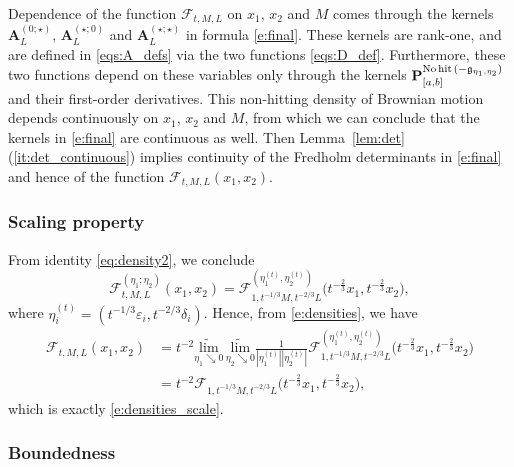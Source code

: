 \documentclass[oneside,final,11pt]{amsart}
\theoremstyle{definition}
\newcommand\nohit{\uptext{No\! hit}}
\newcommand{\fg}{\mathfrak{g}}
\newcommand{\mylim}[1]{\underset{#1}{\wt{\mathrm{lim}}}}
\newcommand{\dens}{\CF}
\newcommand{\1}[1]{\mathbf{1}_{#1}}
\newcommand{\eps}{\varepsilon}
\newcommand{\wt}{\widetilde}
\newcommand{\kmtext}[1]{{\color{red}[KM:#1]}}
\newcommand{\uptext}[1]{\text{\upshape{#1}}}
\newcommand{\fM}{M}
\newcommand{\fP}{\mathbf{P}}
\newcommand{\fA}{\mathbf{A}}
\newcommand{\CF}{\mathcal{F}}
\numberwithin{equation}{section}
\begin{document}
Dependence of the function $\dens_{t, \fM, L}$ on $x_1$, $x_2$ and $M$ comes through the kernels $\fA_L^{(0; \star)}$, $\fA_L^{(\star; 0)}$ and $\fA_L^{(\star; \star)}$ in formula \eqref{e:final}. These kernels are rank-one, and are defined in \eqref{eqs:A_defs} via the two functions \eqref{eqs:D_def}. Furthermore, these two functions depend on these variables only through the kernels $\fP_{[a, b]}^{\nohit\,(-\fg_{\eta_1, \eta_2})}$ and their first-order derivatives. This non-hitting density of Brownian motion depends continuously on $x_1$, $x_2$ and $M$, from which we can conclude that the kernels in \eqref{e:final} are continuous as well. Then Lemma~\ref{lem:det}(\ref{it:det_continuous}) implies continuity of the Fredholm determinants in \eqref{e:final} and hence of the function $\dens_{t, M, L}(x_1, x_2)$.

\subsubsection{Scaling property}
\label{ss:scaling_of_P}

From identity \eqref{eq:density2}, we conclude
\begin{equation}
\dens_{t, \fM, L}^{(\eta_1; \eta_2)}(x_1, x_2) = \dens_{1, t^{-1/3} \fM, t^{-2/3} L}^{(\eta^{(t)}_1, \eta^{(t)}_2)} \bigl(t^{-\frac{2}{3}} x_1, t^{-\frac{2}{3}} x_2\bigr),
\end{equation}
where $\eta^{(t)}_i = (t^{-1/3} \eps_i, t^{-2/3} \delta_i)$. Hence, from \eqref{e:densities}, we have
\begin{align}
\dens_{t, \fM, L}(x_1, x_2) &= t^{-2} \mylim{\eta_1 \searrow 0}\, \mylim{\eta_2 \searrow 0} \frac{1}{|\eta^{(t)}_1| |\eta^{(t)}_2|} \dens_{1, t^{-1/3} \fM, t^{-2/3} L}^{(\eta^{(t)}_1, \eta^{(t)}_2)} \bigl(t^{-\frac{2}{3}} x_1, t^{-\frac{2}{3}} x_2\bigr) \\
&= t^{-2} \dens_{1, t^{-1/3} \fM, t^{-2/3} L} \bigl(t^{-\frac{2}{3}} x_1, t^{-\frac{2}{3}} x_2\bigr),
\end{align}
which is exactly \eqref{e:densities_scale}.

\subsubsection{Boundedness}
\label{ss:bound_on_P}

\end{document}
